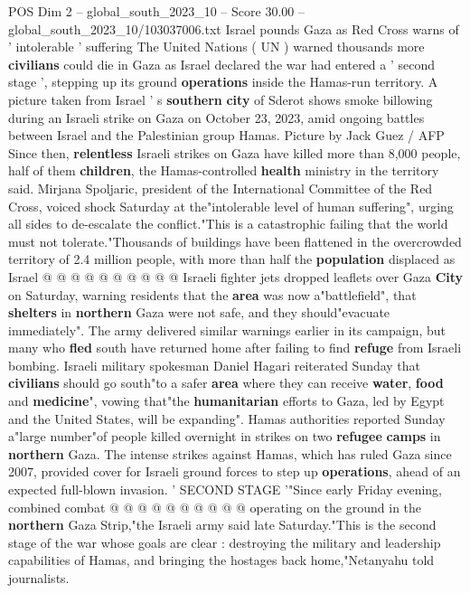 \begin{textsample}{POS Dim 2 – global\_south\_2023\_10 – Score 30.00 – global\_south\_2023\_10/103037006.txt}  \label{ex:f2_pos_173}
Israel pounds Gaza as Red Cross warns of ' intolerable ' suffering The United Nations ( UN ) warned thousands more \textbf{civilians} could die in Gaza as Israel declared the war had entered a ' second stage ', stepping up its ground \textbf{operations} inside the Hamas-run territory.
A picture taken from Israel ' s \textbf{southern} \textbf{city} of Sderot shows smoke billowing during an Israeli strike on Gaza on October 23, 2023, amid ongoing battles between Israel and the Palestinian group Hamas.
Picture by Jack Guez / AFP Since then, \textbf{relentless} Israeli strikes on Gaza have killed more than 8,000 people, half of them \textbf{children}, the Hamas-controlled \textbf{health} ministry in the territory said.
Mirjana Spoljaric, president of the International Committee of the Red Cross, voiced shock Saturday at the"intolerable level of human suffering", urging all sides to de-escalate the conflict."This is a catastrophic failing that the world must not tolerate."Thousands of buildings have been flattened in the overcrowded territory of 2.4 million people, with more than half the \textbf{population} displaced as Israel @ @ @ @ @ @ @ @ @ @ Israeli fighter jets dropped leaflets over Gaza \textbf{City} on Saturday, warning residents that the \textbf{area} was now a"battlefield", that \textbf{shelters} in \textbf{northern} Gaza were not safe, and they should"evacuate immediately".
The army delivered similar warnings earlier in its campaign, but many who \textbf{fled} south have returned home after failing to find \textbf{refuge} from Israeli bombing.
Israeli military spokesman Daniel Hagari reiterated Sunday that \textbf{civilians} should go south"to a safer \textbf{area} where they can receive \textbf{water}, \textbf{food} and \textbf{medicine}", vowing that"the \textbf{humanitarian} efforts to Gaza, led by Egypt and the United States, will be expanding".
Hamas authorities reported Sunday a"large number"of people killed overnight in strikes on two \textbf{refugee} \textbf{camps} in \textbf{northern} Gaza.
The intense strikes against Hamas, which has ruled Gaza since 2007, provided cover for Israeli ground forces to step up \textbf{operations}, ahead of an expected full-blown invasion. ' SECOND STAGE '"Since early Friday evening, combined combat @ @ @ @ @ @ @ @ @ @ operating on the ground in the \textbf{northern} Gaza Strip,"the Israeli army said late Saturday."This is the second stage of the war whose goals are clear : destroying the military and leadership capabilities of Hamas, and bringing the hostages back home,"Netanyahu told journalists.

\end{textsample}
